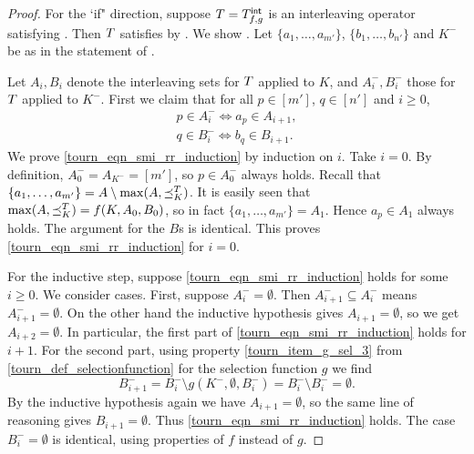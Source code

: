 \begin{proof}
    For the `if" direction, suppose $T = {T_{f, g}^\mathsf{int}}$ is an interleaving
    operator satisfying \smi{}. Then $T$ satisfies
    \chaindef{} by . We
    show \rankremoval{}. Let $\{a_1, \ldots, a_{m'}\}$, $\{b_1,
    \ldots, b_{n'}\}$ and $K^-$ be as in the statement of
    \rankremoval{}.

    Let $A_i, B_i$ denote the interleaving sets for $T$ applied to $K$, and
    $A^-_i, B^-_i$ those for $T$ applied to $K^-$. First we claim that for
    all $p \in [m']$, $q \in [n']$ and $i \ge 0$,
    \begin{equation}
        \label{tourn_eqn_smi_rr_induction}
        \begin{split}
            p \in A^-_i \iff a_p \in A_{i + 1}, \\
            q \in B^-_i \iff b_q \in B_{i + 1}.
        \end{split}
    \end{equation}
    We prove \cref{tourn_eqn_smi_rr_induction} by induction on $i$. Take
    $i = 0$. By definition, $A^-_0 = A_{K^-} = [m']$, so $p \in A^-_0$ always
    holds. Recall that $\{a_1, \ldots, a_{m'}\} = A \setminus \max(A,
    {\preceq_K^T})$. It is easily seen that $\max(A, {\preceq_K^T}) = f(K, A_0,
    B_0)$, so in fact $\{a_1, \ldots, a_{m'}\} = A_1$. Hence $a_p \in A_1$
    always holds. The argument for the $B$s is identical. This proves
    \cref{tourn_eqn_smi_rr_induction} for $i = 0$.

    For the inductive step, suppose \cref{tourn_eqn_smi_rr_induction}
    holds for some $i \ge 0$. We consider cases. First, suppose $A^-_i =
    \emptyset$. Then $A^-_{i + 1} \subseteq A^-_i$ means $A^-_{i + 1} =
    \emptyset$. On the other hand the inductive hypothesis gives $A_{i + 1} =
    \emptyset$, so we get $A_{i + 2} = \emptyset$. In particular, the first
    part of \cref{tourn_eqn_smi_rr_induction} holds for $i + 1$. For the
    second part, using property \cref{tourn_item_g_sel_3} from
    \cref{tourn_def_selectionfunction} for the selection function $g$ we find
    \[
        B^-_{i + 1}
        = B^-_i \setminus g(K^-, \emptyset, B^-_i)
        = B^-_i \setminus B^-_i
        = \emptyset.
    \]
    By the inductive hypothesis again we have $A_{i + 1} = \emptyset$, so the
    same line of reasoning gives $B_{i + 1} = \emptyset$. Thus
    \cref{tourn_eqn_smi_rr_induction} holds. The case $B^-_i = \emptyset$
    is identical, using properties of $f$ instead of $g$.


\end{proof}
